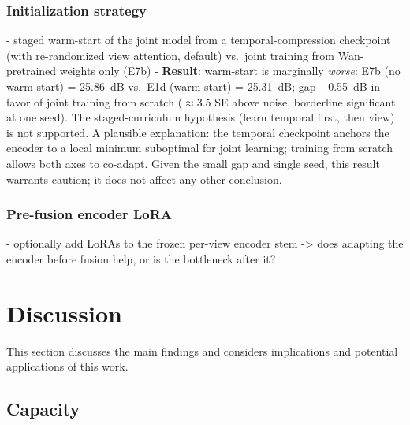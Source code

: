 \subsubsection{Initialization strategy}
- staged warm-start of the joint model from a temporal-compression checkpoint (with re-randomized view attention, default) vs.\ joint training from Wan-pretrained weights only (E7b)
- \textbf{Result}: warm-start is marginally \emph{worse}: E7b (no warm-start) = 25.86~dB vs.\ E1d (warm-start) = 25.31~dB; gap $-$0.55~dB in favor of joint training from scratch ($\approx$3.5 SE above noise, borderline significant at one seed). The staged-curriculum hypothesis (learn temporal first, then view) is not supported. A plausible explanation: the temporal checkpoint anchors the encoder to a local minimum suboptimal for joint learning; training from scratch allows both axes to co-adapt. Given the small gap and single seed, this result warrants caution; it does not affect any other conclusion.

\subsubsection{Pre-fusion encoder LoRA}
- optionally add LoRAs to the frozen per-view encoder stem -> does adapting the encoder before fusion help, or is the bottleneck after it?

\section{Discussion}

This section discusses the main findings and considers implications and potential applications of this work.

\subsection{Capacity}

